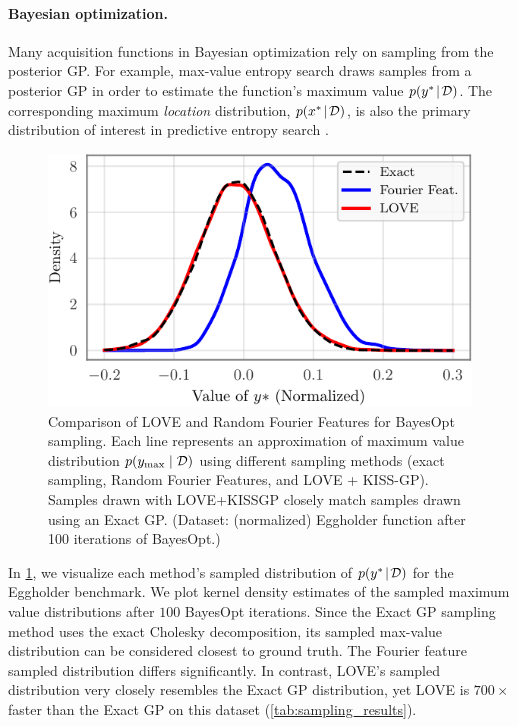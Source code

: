 \paragraph{Bayesian optimization.}
Many acquisition functions in Bayesian optimization rely on sampling from the posterior GP.
For example, max-value entropy search \cite{wang2017max} draws samples from a posterior GP in order to estimate the function's maximum value $p(y^{*} \! \mid \! \mathcal D)$.
The corresponding maximum \emph{location} distribution, $p(x^{*} \! \mid \! \mathcal D)$, is also the primary distribution of interest in predictive entropy search \cite{hernandez2014predictive}.
%
\begin{figure}[t!]
  \centering
  \includegraphics[width=0.70\columnwidth]{figures/thompson_sampling_comparison.pdf}
  \caption[Comparison of LOVE and Random Fourier Features for BayesOpt sampling.]{
    Comparison of LOVE and Random Fourier Features for BayesOpt sampling.
    Each line represents an approximation of maximum value distribution $p(y_\text{max} \mid \mathcal D)$ using different sampling methods (exact sampling, Random Fourier Features, and LOVE + KISS-GP).
    Samples drawn with LOVE+KISSGP closely match samples drawn using an Exact GP.
    (Dataset: (normalized) Eggholder function after 100 iterations of BayesOpt.)
    \label{fig:thompson_sampling_comparison}
  }
    \vspace{-2ex}
\end{figure}
%
In \cref{fig:thompson_sampling_comparison}, we visualize each method's sampled distribution of $p(y^{*} \! \mid \! \mathcal D)$ for the Eggholder benchmark.
We plot kernel density estimates of the sampled maximum value distributions after $100$ BayesOpt iterations.
Since the Exact GP sampling method uses the exact Cholesky decomposition, its sampled max-value distribution can be considered closest to ground truth.
The Fourier feature sampled distribution differs significantly.
In contrast, LOVE{}'s sampled distribution very closely resembles the Exact GP distribution, yet
LOVE{} is $700 \times$ faster than the Exact GP on this dataset (\cref{tab:sampling_results}).
